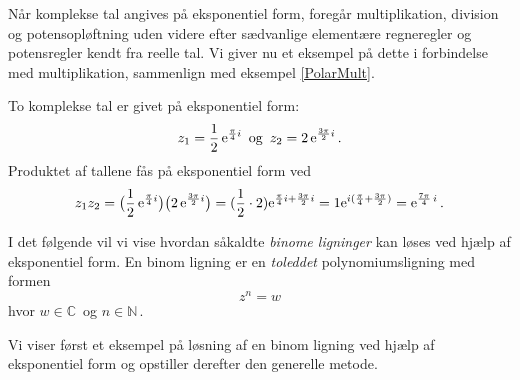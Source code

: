 Når komplekse tal angives på eksponentiel form, foregår multiplikation, division og potensopløftning uden videre efter sædvanlige elementære regneregler og potensregler kendt fra reelle tal. Vi giver nu et eksempel på dette i forbindelse med multiplikation, sammenlign med eksempel \ref{PolarMult}.

\begin{example}
To komplekse tal er givet på eksponentiel form:
$$z_1=\frac 12\,\mathrm{e}^{\frac{\pi}{4} i}\,\,\,\mathrm{og}\,\,\,
z_2=2\,\mathrm{e}^{\frac{3\pi}{2} i}\,.$$
Produktet af tallene fås på eksponentiel form ved
$$z_1z_2=\big(\frac 12\,\mathrm{e}^{\frac{\pi}{4}i}\big)\big(2\,\mathrm{e}^{\frac{3\pi}{2}i}\big)=
(\frac 12\cdot 2)\mathrm{e}^{\frac{\pi}{4}i+\frac{3\pi}{2}i}=
1\mathrm{e}^{i(\frac{\pi}{4}+\frac{3\pi}{2})}=
\mathrm{e}^{\frac{7\pi}{4}\,i}\,.
$$
\end{example}
I det følgende vil vi vise hvordan såkaldte \textit{binome ligninger} kan løses ved hjælp af eksponentiel form. En binom ligning er en \textit{toleddet} polynomiumsligning med formen
\begin{equation}
z^n=w
\end{equation}
hvor $w\in \mathbb C\,$ og $n\in\mathbb N\,$.\bs

Vi viser først et eksempel på løsning af en binom ligning ved hjælp af eksponentiel form og opstiller derefter den generelle metode.

